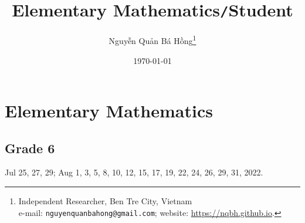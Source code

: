 \documentclass{article}
\title{Elementary Mathematics\texttt{/}Student}
\author{\selectlanguage{vietnamese} Nguyễn Quản Bá Hồng\footnote{Independent Researcher, Ben Tre City, Vietnam\\e-mail: \texttt{nguyenquanbahong@gmail.com}; website: \url{https://nqbh.github.io}.}}
\date{\today}
\numberwithin{equation}{section}
\begin{document}
\maketitle
{}
\begin{abstract}
	
\end{abstract}

\tableofcontents
{}


\section{Elementary Mathematics}

\subsection{Grade 6}
Jul 25, 27, 29; Aug 1, 3, 5, 8, 10, 12, 15, 17, 19, 22, 24, 26, 29, 31, 2022.
\end{document}
